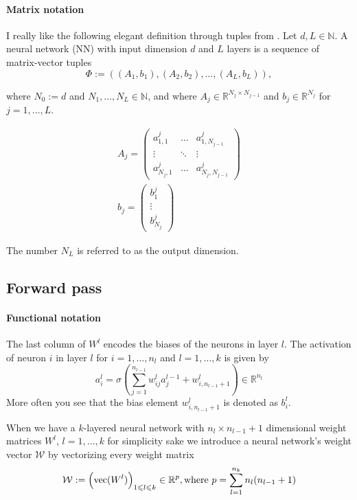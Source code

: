 \documentclass[draft]{article}
\def\RealSet{\mathbb{R}}
\DeclareMathOperator{\vect}{vec}
\begin{document}
\paragraph{Matrix notation}
I really like the following elegant definition through tuples from \cite{Karner:2022}. Let $d, L \in \mathbb{N}$. A neural network (NN) with input dimension $d$ and $L$ layers is
a sequence of matrix-vector tuples
\[
\Phi := ((A_1, b_1), (A_2, b_2), \ldots , (A_L, b_L)),
\]

where $N_0 := d$ and $N_1, \ldots , N_L \in \mathbb{N}$, and where $A_j \in \RealSet^{N_{j}\times N_{j-1}}$ and $b_j \in \RealSet^{N_j}$ for $j = 1, \ldots, L$.

\begin{gather}
A_j = \begin{pmatrix}
  a^j_{1,1} & \dots & a^j_{1,N_{j-1}} \\
  \vdots & \ddots & \vdots \\
  a^j_{N_{j},1} & \dots & a^j_{N_{j},N_{j-1}}
  \end{pmatrix} \\
b_j = \begin{pmatrix}
  b^j_{1} \\
  \vdots \\
  b^j_{N_j}
\end{pmatrix}
\end{gather}
  
The number $N_L$ is referred to as the output dimension.


\subsection{Forward pass}

\paragraph{Functional notation}
The last column of $W^l$ encodes the biases of the neurons in layer $l$. The activation of neuron $i$ in layer $l$ for $i = 1,\dots,n_l$ and $l = 1,\dots,k$ is given by
\begin{equation}\label{forward_f}
a^l_i = \sigma \left( \sum_{j=1}^{n_{l-1}} w_{ij}^l a_j^{l-1} + w_{i,n_{l-1}+1}^l \right) \in \RealSet^{n_l}
\end{equation}
More often you see that the bias element $w^l_{i,n_{l-1}+1}$ is denoted as $b_i^l$.

When we have a $k$-layered neural network with $n_l \times n_{l-1}+1$ dimensional weight matrices $W^l$, $l=1,\dots,k$ for simplicity sake we introduce a neural network's weight vector $\mathcal{W}$ by vectorizing every weight matrix
\[
\mathcal{W} := \Bigl(\vect(W^l)\Bigr)_{1\leqslant l\leqslant k} \in \RealSet^p, \text{where $p=\sum_{l=1}^{n_k} n_l(n_{l-1}+1)$}
\]
\end{document}
